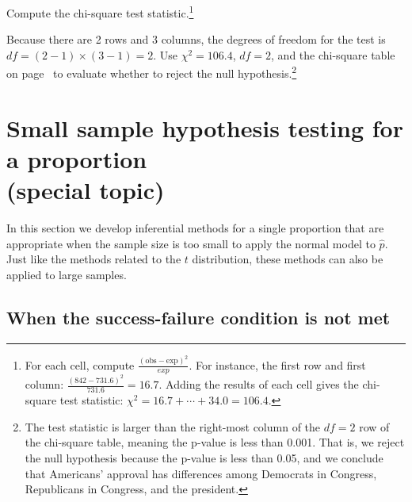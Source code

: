 \begin{exercise}
Compute the chi-square test statistic.\footnote{For each cell, compute $\frac{(\text{obs} - \text{exp})^2}{exp}$. For instance, the first row and first column: $\frac{(842-731.6)^2}{731.6} = 16.7$. Adding the results of each cell gives the chi-square test statistic: {\scriptsize$\chi^2 = 16.7 + \cdots + 34.0 = 106.4$}.}
\end{exercise}

\begin{exercise}
Because there are 2 rows and 3 columns, the degrees of freedom for the test is $df=(2-1)\times (3-1) = 2$. Use $\chi^2=106.4$, $df=2$, and the chi-square table on page~\pageref{chiSquareProbabilityTable} to evaluate whether to reject the null hypothesis.\footnote{The test statistic is larger than the right-most column of the $df=2$ row of the chi-square table, meaning the p-value is less than 0.001. That is, we reject the null hypothesis because the p-value is less than 0.05, and we conclude that Americans' approval has differences among Democrats in Congress, Republicans in Congress, and the president.}
\end{exercise}




\section[Small sample hypothesis testing for a proportion (special topic)]{Small sample hypothesis testing for a proportion\\(special topic)}
\label{smallSampleHTForProportion}

In this section we develop inferential methods for a single proportion that are appropriate when the sample size is too small to apply the normal model to $\hat{p}$. Just like the methods related to the $t$ distribution, these methods can also be applied to large samples.

\subsection{When the success-failure condition is not met}

